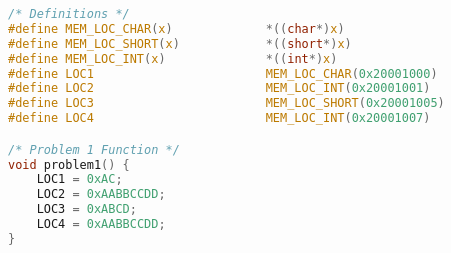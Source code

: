 \begin{lstlisting}[language=c,caption=Problem 1, label=list:p1]
/* Definitions */
#define MEM_LOC_CHAR(x)             *((char*)x)
#define MEM_LOC_SHORT(x)            *((short*)x)
#define MEM_LOC_INT(x)              *((int*)x)
#define LOC1                        MEM_LOC_CHAR(0x20001000)
#define LOC2                        MEM_LOC_INT(0x20001001)
#define LOC3                        MEM_LOC_SHORT(0x20001005)
#define LOC4                        MEM_LOC_INT(0x20001007)

/* Problem 1 Function */
void problem1() {
    LOC1 = 0xAC;
    LOC2 = 0xAABBCCDD;
    LOC3 = 0xABCD;
    LOC4 = 0xAABBCCDD;
}
\end{lstlisting}